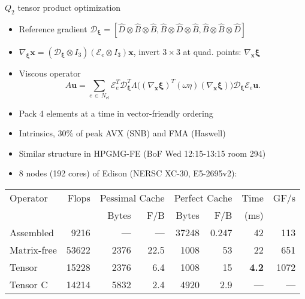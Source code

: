 \documentclass{beamer}
\begin{document}


\begin{frame}{$Q_2$ tensor product optimization}
  \begin{itemize}
  \item Reference gradient $\mathcal D_{\mathbf \xi} = [ \hat D \otimes \hat B \otimes \hat B, \hat B \otimes \hat D \otimes \hat B, \hat B \otimes \hat B \otimes \hat D]$
  \item $\nabla_{\mathbf\xi} \mathbf x = (\mathcal D_{\mathbf\xi}\otimes I_3) (\mathcal E_e\otimes I_3) \mathbf x$, invert $3\times 3$ at quad. points: $\nabla_{\mathbf x} \mathbf \xi$
  \item Viscous operator
    \begin{equation*}
      A \mathbf u = \sum_{e \, \in \, N_\text{el}} \mathcal E_e^T \mathcal D_{\mathbf \xi}^T \Lambda\Big((\nabla_{\mathbf x}\mathbf\xi)^T (\omega \eta) (\nabla_{\mathbf x}\mathbf\xi) \Big) \mathcal D_{\mathbf \xi} \mathcal E_e \mathbf u .
    \end{equation*}
  \item Pack 4 elements at a time in vector-friendly ordering
  \item Intrinsics, $30\%$ of peak AVX (SNB) and FMA (Haswell)
  \item Similar structure in HPGMG-FE (BoF Wed 12:15-13:15 room 294)
  \item 8 nodes (192 cores) of Edison (NERSC XC-30, E5-2695v2):
  \end{itemize}
  \vspace{-1em}
  \begin{center}
    \begin{tabular}{lrrrrrrr}
      \toprule
      Operator & Flops & \multicolumn{2}{c}{Pessimal Cache} & \multicolumn{2}{c}{Perfect Cache} & Time & GF/s \\
               & & Bytes & F/B & Bytes & F/B & (ms) & \\
      \midrule
      Assembled & 9216 & --- & --- &  37248 & 0.247 & 42 & 113 \\
      Matrix-free & 53622 & 2376 & 22.5 & 1008 & 53 & 22 & 651 \\
      Tensor & 15228 & 2376 & 6.4 & 1008 & 15 & \textbf {4.2} & 1072 \\
      Tensor C & 14214 & 5832 & 2.4 & 4920 & 2.9 & --- & --- \\
      \bottomrule
    \end{tabular}
  \end{center}
\end{frame}
\end{document}
